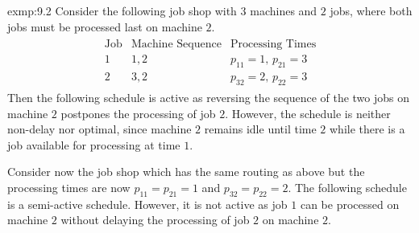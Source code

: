 \begin{exmp}{exmp:9.2}
    Consider the following job shop with $3$ machines and $2$ jobs, where 
    both jobs must be processed last on machine $2$.  
    \begin{align*}
        \begin{array}{c|c|c}
            \text{Job} & \text{Machine Sequence} & \text{Processing Times} \\ \hline 
            1 & 1, 2 & p_{11} = 1,\, p_{21} = 3 \\ 
            2 & 3, 2 & p_{32} = 2,\, p_{22} = 3
        \end{array}
    \end{align*}
    Then the following schedule is active as reversing the sequence 
    of the two jobs on machine $2$ postpones the processing of job $2$. 
    However, the schedule is neither non-delay nor optimal, since machine 
    $2$ remains idle until time $2$ while there is a job available for processing 
    at time $1$. 
    \begin{center} 
    \end{center} 
    \vspace{-0.5cm}
    Consider now the job shop which has the same routing as above but 
    the processing times are now $p_{11} = p_{21} = 1$ and 
    $p_{32} = p_{22} = 2$. The following schedule is a semi-active schedule.
    However, it is not active as job $1$ can be processed on machine $2$ 
    without delaying the processing of job $2$ on machine $2$.  
    \begin{center} 
        \begin{tikzpicture}[/pgfgantt/y unit chart=0.65cm] 

\end{tikzpicture}
\end{center}
\end{exmp}
